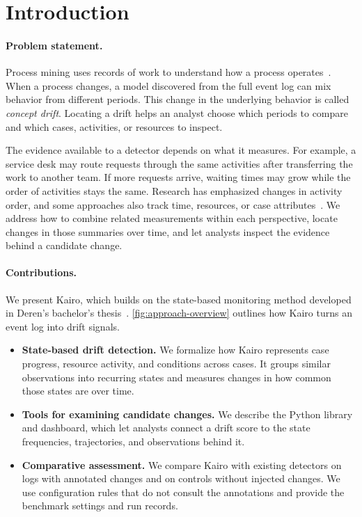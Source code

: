 \section{Introduction}
\label{sec:introduction}

\paragraph{Problem statement.}
Process mining uses records of work to understand how a process operates~\cite{vanderaalst2016process}. When a process changes, a model discovered from the full event log can mix behavior from different periods. This change in the underlying behavior is called \emph{concept drift}. Locating a drift helps an analyst choose which periods to compare and which cases, activities, or resources to inspect.

The evidence available to a detector depends on what it measures. For example, a service desk may route requests through the same activities after transferring the work to another team. If more requests arrive, waiting times may grow while the order of activities stays the same. Research has emphasized changes in activity order, and some approaches also track time, resources, or case attributes~\cite{sato2022survey}. We address how to combine related measurements within each perspective, locate changes in those summaries over time, and let analysts inspect the evidence behind a candidate change.

\paragraph{Contributions.}
We present Kairo, which builds on the state-based monitoring method developed in Deren's bachelor's thesis~\cite{kairo-thesis}. \autoref{fig:approach-overview} outlines how Kairo turns an event log into drift signals.

\begin{itemize}
  \item \textbf{State-based drift detection.} We formalize how Kairo represents case progress, resource activity, and conditions across cases. It groups similar observations into recurring states and measures changes in how common those states are over time.
  \item \textbf{Tools for examining candidate changes.} We describe the Python library and dashboard, which let analysts connect a drift score to the state frequencies, trajectories, and observations behind it.
  \item \textbf{Comparative assessment.} We compare Kairo with existing detectors on logs with annotated changes and on controls without injected changes. We use configuration rules that do not consult the annotations and provide the benchmark settings and run records.
\end{itemize}

